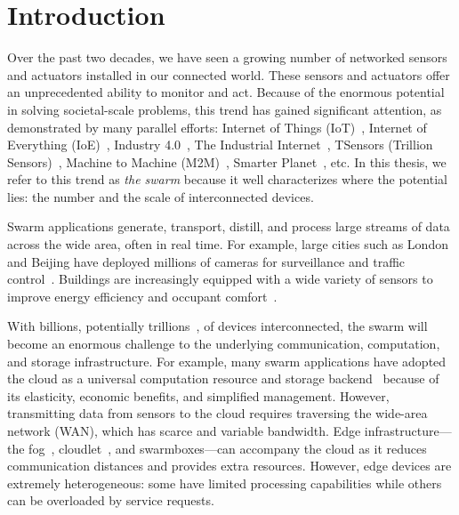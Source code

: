 \documentclass[thesis.tex]{subfiles}
\begin{document}
\chapter{Introduction}

Over the past two decades, we have seen a growing number of networked sensors
and actuators installed in our connected world. These sensors and actuators
offer an unprecedented ability to monitor and act. Because of the enormous
potential in solving societal-scale problems, this trend has gained significant
attention, as demonstrated by many parallel efforts: Internet of Things
(IoT)~\cite{atzori2010internet}, Internet of Everything
(IoE)~\cite{bradley2013internet}, Industry 4.0~\cite{lasi2014industry}, The
Industrial Internet~\cite{eigner2018industrial}, TSensors (Trillion
Sensors)~\cite{bogue2014towards}, Machine to Machine
(M2M)~\cite{anton2014machine}, Smarter Planet~\cite{palmisano2008smarter},
etc. In this thesis, we refer to this trend as \textit{the swarm} because it
well characterizes where the potential lies: the number and the scale of
interconnected devices.

Swarm applications generate, transport, distill, and process large streams of
data across the wide area, often in real time. For example, large cities such as
London and Beijing have deployed millions of cameras for surveillance and
traffic control~\cite{skynet, london.surveillance}. Buildings are increasingly
equipped with a wide variety of sensors to improve energy efficiency and
occupant comfort~\cite{dawson2010smap, krioukov2012building}.

With billions, potentially trillions~\cite{middleton2013forecast}, of devices
interconnected, the swarm will become an enormous challenge to the underlying
communication, computation, and storage infrastructure. For example, many swarm
applications have adopted the cloud as a universal computation resource and
storage backend~\cite{carriots, sami, gupta2014bolt, zachariah1001internet}
because of its elasticity, economic benefits, and simplified
management. However, transmitting data from sensors to the cloud requires
traversing the wide-area network (WAN), which has scarce and variable
bandwidth. Edge infrastructure---the fog~\cite{bonomi2012fog, bar2013fog},
cloudlet~\cite{ha2014towards, satyanarayanan2009case, chen2018application}, and
swarmboxes---can accompany the cloud as it reduces communication distances and
provides extra resources. However, edge devices are extremely heterogeneous:
some have limited processing capabilities while others can be overloaded by
service requests.
\end{document}
